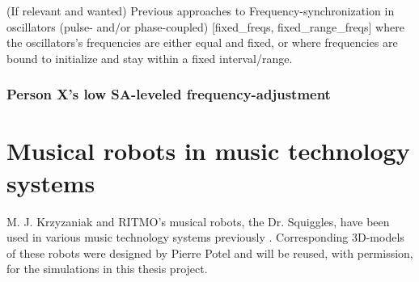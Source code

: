 	(If relevant and wanted) \nl
	Previous approaches to Frequency-synchronization in oscillators (pulse- and/or phase-coupled) [fixed\_freqs, fixed\_range\_freqs] where the oscillators's frequencies are either equal and fixed, or where frequencies are bound to initialize and stay within a fixed interval/range.
	
	
	\subsubsection{Person X's low SA-leveled frequency-adjustment}
	
	
	
	


\section{Musical robots in music technology systems}

	M. J. Krzyzaniak and RITMO's musical robots, the Dr. Squiggles, have been used in various music technology systems previously \cite{dr_squiggles}. Corresponding 3D-models of these robots were designed by Pierre Potel \cite{pierre_potel} and will be reused, with permission, for the simulations in this thesis project.